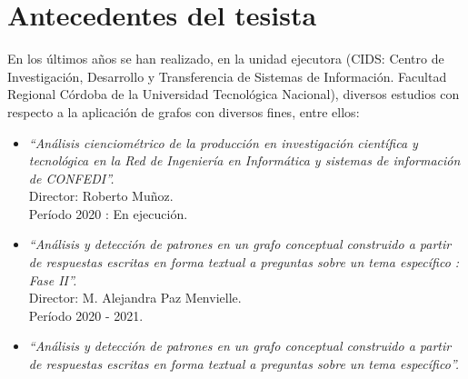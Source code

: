 \documentclass[
	11pt,oneside,a4paper,
	headsepline,footsepline,
	fleqn,
]{memoir}
\begin{document}
\section{Antecedentes del tesista}

En los últimos años se han realizado, en la unidad ejecutora (CIDS: Centro de Investigación, Desarrollo y Transferencia de Sistemas de Información. Facultad Regional Córdoba de la Universidad Tecnológica Nacional), diversos estudios con respecto a la aplicación de grafos con diversos fines, entre ellos:

\begin{itemize}
	\item \emph{“Análisis cienciométrico de la producción en investigación científica y tecnológica en la Red de Ingeniería en Informática y sistemas de información de CONFEDI”.} \\
	      Director: Roberto Muñoz. \\
	      Período 2020 : En ejecución.
	\item \emph{“Análisis y detección de patrones en un grafo conceptual construido a partir de respuestas escritas en forma textual a preguntas sobre un tema específico : Fase II”.} \\
	      Director: M. Alejandra Paz Menvielle. \\
	      Período 2020 - 2021.
	\item \emph{“Análisis y detección de patrones en un grafo conceptual construido a partir de respuestas escritas en forma textual a preguntas sobre un tema específico”.} \\

\end{itemize}
\end{document}
